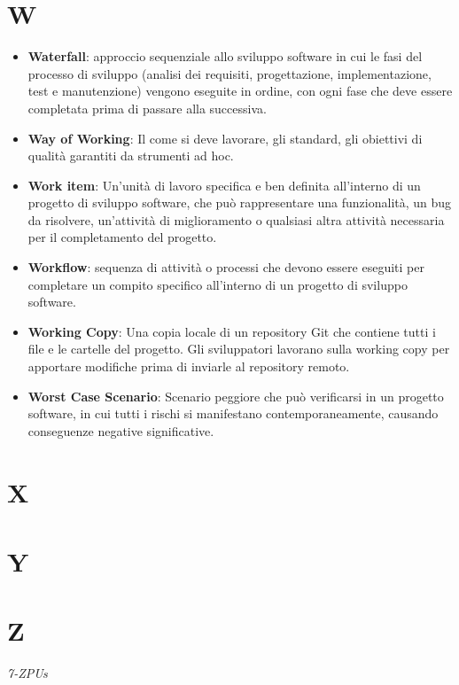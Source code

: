 \documentclass[a4paper,12pt]{article}
\begin{document}
\section{W}
\begin{itemize}
    \item \textbf{Waterfall}: approccio sequenziale allo sviluppo software in cui le fasi del processo di sviluppo (analisi dei requisiti, progettazione, implementazione, test e manutenzione) vengono eseguite in ordine, con ogni fase che deve essere completata prima di passare alla successiva. 
    \item \textbf{Way of Working}: Il come si deve lavorare, gli standard, gli obiettivi di qualità garantiti da strumenti ad hoc.
\end{itemize}
\begin{itemize}
    \item \textbf{Work item}: Un'unità di lavoro specifica e ben definita all'interno di un progetto di sviluppo software, che può rappresentare una funzionalità, un bug da risolvere, un'attività di miglioramento o qualsiasi altra attività necessaria per il completamento del progetto.
    \item \textbf{Workflow}: sequenza di attività o processi che devono essere eseguiti per completare un compito specifico all'interno di un progetto di sviluppo software. 
    \item \textbf{Working Copy}: Una copia locale di un repository Git che contiene tutti i file e le cartelle del progetto. Gli sviluppatori lavorano sulla working copy per apportare modifiche prima di inviarle al repository remoto.
    \item \textbf{Worst Case Scenario}: Scenario peggiore che può verificarsi in un progetto software, in cui tutti i rischi si manifestano contemporaneamente, causando conseguenze negative significative.
\end{itemize}
\section{X}
\section{Y}
\section{Z}


\vfill
\begin{flushright}
    \textit{7-ZPUs}
\end{flushright}
\end{document}
